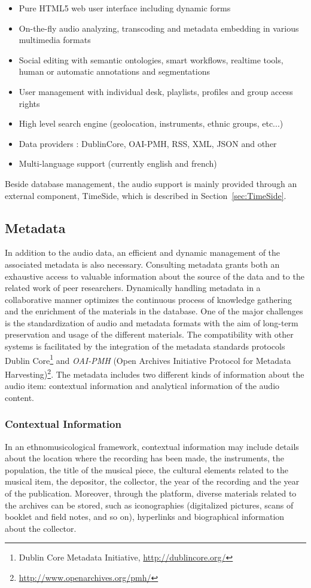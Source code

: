 \documentclass{sig-alternate}
\begin{document}
      \begin{itemize}
      \item Pure HTML5 web user interface including dynamic forms
      \item On-the-fly audio analyzing, transcoding and metadata
        embedding in various multimedia formats
      \item Social editing with semantic ontologies, smart workflows,
        realtime tools, human or automatic annotations and
        segmentations
      \item User management with individual desk, playlists, profiles
        and group access rights
      \item High level search engine (geolocation, instruments, ethnic groups, etc...)
      \item Data providers : DublinCore, OAI-PMH, RSS, XML, JSON and other 
      \item Multi-language support (currently english and french)
      \end{itemize}
Beside database management, the audio support is mainly provided through an external component, TimeSide, which is described in Section~\ref{sec:TimeSide}.
\subsection{Metadata}\label{sec:metadata}
In addition to the audio data, an efficient and dynamic management of the associated metadata is also necessary. Consulting metadata grants both an exhaustive access to valuable information about the source of the data and to the related work of peer researchers. 
Dynamically handling metadata in a collaborative manner optimizes the continuous process of knowledge gathering and the enrichment of the materials in the database.  
One of the major challenges is the standardization of audio and metadata formats with the aim of long-term preservation and usage of the different materials.
The compatibility with other systems is facilitated by the integration of the metadata standards protocols Dublin Core\footnote{{Dublin Core} Metadata Initiative, \url{http://dublincore.org/}} and \emph{OAI-PMH} (Open Archives Initiative Protocol for Metadata Harvesting)\footnote{\url{http://www.openarchives.org/pmh/}}.
The metadata includes two different kinds of information about the audio item: contextual information and analytical information of the audio content.
\subsubsection{Contextual Information}
In an ethnomusicological framework, contextual information may include details about the location where the recording has been made, the instruments, the population, the title of the musical piece, the cultural elements related to the musical item, the depositor, the collector, the year of the recording and the year of the publication. 
Moreover, through the platform, diverse materials related to the archives can be stored, such as iconographies (digitalized pictures, scans of booklet and field notes, and so on), hyperlinks and biographical information about the collector. 
\end{document}
